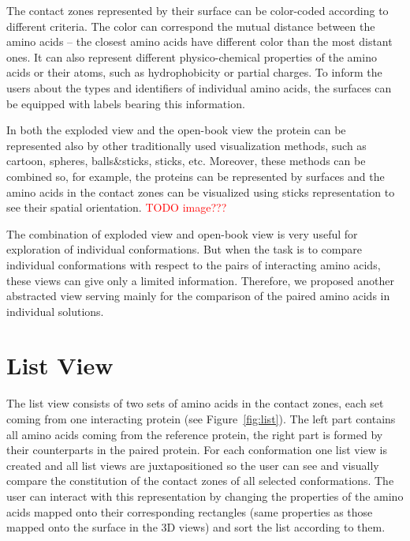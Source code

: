 \documentclass[journal]{vgtc}                %
\begin{document}
The contact zones represented by their surface can be color-coded according to different criteria.
The color can correspond the mutual distance between the amino acids -- the closest amino acids have different color than the most distant ones.
It can also represent different physico-chemical properties of the amino acids or their atoms, such as hydrophobicity or partial charges.
To inform the users about the types and identifiers of individual amino acids, the surfaces can be equipped with labels bearing this information.

In both the exploded view and the open-book view the protein can be represented also by other traditionally used visualization methods, such as cartoon, spheres, balls\&sticks, sticks, etc.
Moreover, these methods can be combined so, for example, the proteins can be represented by surfaces and the amino acids in the contact zones can be visualized using sticks representation to see their spatial orientation. \textcolor{red}{TODO image???}

The combination of exploded view and open-book view is very useful for exploration of individual conformations.
But when the task is to compare individual conformations with respect to the pairs of interacting amino acids, these views can give only a limited information.
Therefore, we proposed another abstracted view serving mainly for the comparison of the paired amino acids in individual solutions.

\section{List View}
The list view consists of two sets of amino acids in the contact zones, each set coming from one interacting protein (see Figure~\ref{fig:list}).
The left part contains all amino acids coming from the reference protein, the right part is formed by their counterparts in the paired protein.
For each conformation one list view is created and all list views are juxtapositioned so the user can see and visually compare the constitution of the contact zones of all selected conformations.
The user can interact with this representation by changing the properties of the amino acids mapped onto their corresponding rectangles (same properties as those mapped onto the surface in the 3D views) and sort the list according to them.
\end{document}
